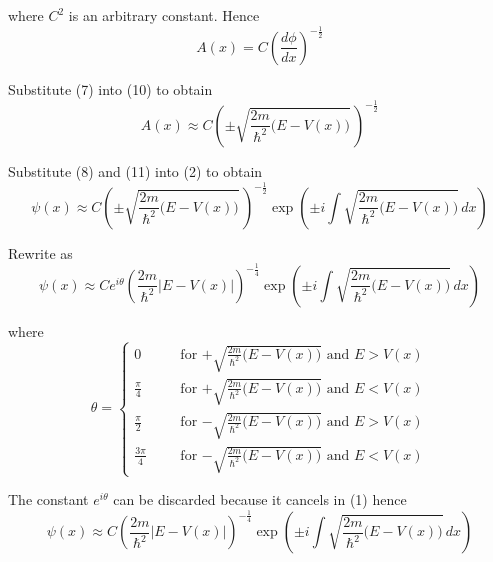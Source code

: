 where $C^2$ is an arbitrary constant. Hence
\begin{equation*}
A(x)=C\left(\frac{d\phi}{dx}\right)^{-\frac{1}{2}}
\tag{10}
\end{equation*}

Substitute (7) into (10) to obtain
\begin{equation*}
A(x)\approx C
\left(\pm\sqrt{\frac{2m}{\hbar^2}\bigl(E-V(x)\bigr)}\,\right)^{-\frac{1}{2}}
\tag{11}
\end{equation*}

Substitute (8) and (11) into (2) to obtain
\begin{equation*}
\psi(x)\approx C
\left(\pm\sqrt{\frac{2m}{\hbar^2}\bigl(E-V(x)\bigr)}\,\right)^{-\frac{1}{2}}
\exp\left(\pm i\int\sqrt{\frac{2m}{\hbar^2}\bigl(E-V(x)\bigr)}\,dx\right)
\end{equation*}

Rewrite as
\begin{equation*}
\psi(x)\approx Ce^{i\theta}
\left(\frac{2m}{\hbar^2}\bigl|E-V(x)\bigr|\right)^{-\frac{1}{4}}
\exp\left(\pm i\int\sqrt{\frac{2m}{\hbar^2}\bigl(E-V(x)\bigr)}\,dx\right)
\end{equation*}

where
\begin{equation*}
\theta=\left\{
\begin{aligned}
0& &
&\text{for $+\sqrt{\frac{2m}{\hbar^2}\bigl(E-V(x)\bigr)}$ and $E>V(x)$}
\\[1ex]
\frac{\pi}{4}& &
&\text{for $+\sqrt{\frac{2m}{\hbar^2}\bigl(E-V(x)\bigr)}$ and $E<V(x)$}
\\[1ex]
\frac{\pi}{2}& &
&\text{for $-\sqrt{\frac{2m}{\hbar^2}\bigl(E-V(x)\bigr)}$ and $E>V(x)$}
\\[1ex]
\frac{3\pi}{4}& &
&\text{for $-\sqrt{\frac{2m}{\hbar^2}\bigl(E-V(x)\bigr)}$ and $E<V(x)$}
\end{aligned}
\right.
\end{equation*}

The constant $e^{i\theta}$ can be discarded because it cancels in (1) hence
\begin{equation*}
\psi(x)\approx C
\left(\frac{2m}{\hbar^2}\bigl|E-V(x)\bigr|\right)^{-\frac{1}{4}}
\exp\left(\pm i\int\sqrt{\frac{2m}{\hbar^2}\bigl(E-V(x)\bigr)}\,dx\right)
\end{equation*}


